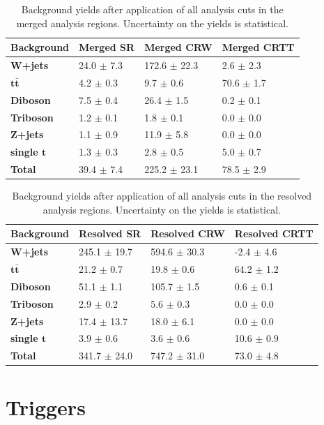 \begin{table}[ht]
\centering
\caption{\label{tab:bkg_yield_merged} Background yields after application of all analysis cuts in the merged analysis regions. Uncertainty on the yields is statistical.}
\begin{tabular}{l l l l}
\toprule
\textbf{Background} & \textbf{Merged SR} & \textbf{Merged CRW} & \textbf{Merged CRTT}\tabularnewline
\midrule
\midrule
\textbf{W+jets} & 24.0 \(\pm\) 7.3 & 172.6 \(\pm\) 22.3 & 2.6 \(\pm\) 2.3\tabularnewline
\midrule
\(\boldsymbol{t\bar{t}}\) & 4.2 \(\pm\) 0.3 & 9.7 \(\pm\) 0.6 & 70.6 \(\pm\) 1.7\tabularnewline
\midrule
\textbf{Diboson} & 7.5 \(\pm\) 0.4 & 26.4 \(\pm\) 1.5 & 0.2 \(\pm\) 0.1\tabularnewline
\midrule
\textbf{Triboson} & 1.2 \(\pm\) 0.1 & 1.8 \(\pm\) 0.1 & 0.0 \(\pm\) 0.0\tabularnewline
\midrule
\textbf{Z+jets} & 1.1 \(\pm\) 0.9 & 11.9 \(\pm\) 5.8 & 0.0 \(\pm\) 0.0\tabularnewline
\midrule
\textbf{single \(\boldsymbol{t}\)} & 1.3 \(\pm\) 0.3 & 2.8 \(\pm\) 0.5 & 5.0 \(\pm\) 0.7\tabularnewline
\midrule
\textbf{Total} & 39.4 \(\pm\) 7.4 &225.2 \(\pm\) 23.1 &78.5 \(\pm\) 2.9\tabularnewline
\bottomrule
\end{tabular}
\end{table}

\begin{table}[ht]
\centering
\caption{\label{tab:bkg_yield_resolved} Background yields after application of all analysis cuts in the resolved analysis regions. Uncertainty on the yields is statistical.}
\begin{tabular}{l l l l}
\toprule
\textbf{Background} & \textbf{Resolved SR} & \textbf{Resolved CRW} & \textbf{Resolved CRTT}\tabularnewline
\midrule
\midrule
\textbf{W+jets} & 245.1 \(\pm\) 19.7 & 594.6 \(\pm\) 30.3 & -2.4 \(\pm\) 4.6\tabularnewline
\midrule
\(\boldsymbol{t\bar{t}}\) & 21.2 \(\pm\) 0.7 & 19.8 \(\pm\) 0.6 & 64.2 \(\pm\) 1.2\tabularnewline
\midrule
\textbf{Diboson} & 51.1 \(\pm\) 1.1 & 105.7 \(\pm\) 1.5 & 0.6 \(\pm\) 0.1\tabularnewline
\midrule
\textbf{Triboson} & 2.9 \(\pm\) 0.2 & 5.6 \(\pm\) 0.3 & 0.0 \(\pm\) 0.0\tabularnewline
\midrule
\textbf{Z+jets} & 17.4 \(\pm\) 13.7 & 18.0 \(\pm\) 6.1 & 0.0 \(\pm\) 0.0\tabularnewline
\midrule
\textbf{single \(\boldsymbol{t}\)} & 3.9 \(\pm\) 0.6 & 3.6 \(\pm\) 0.6 & 10.6 \(\pm\) 0.9\tabularnewline
\midrule
\textbf{Total} & 341.7 \(\pm\) 24.0 &747.2 \(\pm\) 31.0 &73.0 \(\pm\) 4.8\tabularnewline
\bottomrule
\end{tabular}
\end{table}

\section{Triggers}
\label{sec:triggers_evt_selection}


